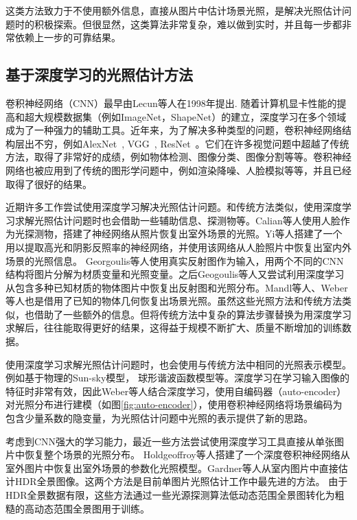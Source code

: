 这类方法致力于不使用额外信息，直接从图片中估计场景光照，是解决光照估计问题时的积极探索。但很显然，这类算法非常复杂，难以做到实时，并且每一步都非常依赖上一步的可靠结果。
\subsection{基于深度学习的光照估计方法}
卷积神经网络（CNN）最早由Lecun等人\cite{lecun1998gradient}在1998年提出. 随着计算机显卡性能的提高和超大规模数据集（例如ImageNet\cite{deng2009imagenet}，ShapeNet\cite{chang2015shapenet}）的建立，深度学习在多个领域成为了一种强力的辅助工具。近年来，为了解决多种类型的问题，卷积神经网络结构层出不穷，例如AlexNet~\cite{krizhevsky2012imagenet}, VGG~\cite{simonyan2014very}, ResNet~\cite{he2016deep}。它们在许多视觉问题中超越了传统方法，取得了非常好的成绩，例如物体检测\cite{girshick2014rich}、图像分类\cite{krizhevsky2012imagenet}、图像分割\cite{ronneberger2015u}等等。卷积神经网络也被应用到了传统的图形学问题中，例如渲染降噪\cite{chaitanya2017interactive}、人脸模拟\cite{karras2017audio}等等，并且已经取得了很好的结果。

近期许多工作尝试使用深度学习解决光照估计问题。和传统方法类似，使用深度学习求解光照估计问题时也会借助一些辅助信息、探测物等。Calian等人\cite{calian2018faces}使用人脸作为光探测物，搭建了神经网络从照片恢复出室外场景的光照。Yi等人\cite{yi2018faces}搭建了一个用以提取高光和阴影反照率的神经网络，并使用该网络从人脸照片中恢复出室内外场景的光照信息。
Georgoulis等人\cite{georgoulis2016delight}使用真实反射图作为输入，用两个不同的CNN结构将图片分解为材质变量和光照变量。之后Geogoulis等人\cite{georgoulis2016natural}又尝试利用深度学习从包含多种已知材质的物体图片中恢复出反射图和光照分布。Mandl等人\cite{mandl2017learning}、Weber等人\cite{weber2018learning}也是借用了已知的物体几何恢复出场景光照。虽然这些光照方法和传统方法类似，也借助了一些额外的信息。但将传统方法中复杂的算法步骤替换为用深度学习求解后，往往能取得更好的结果，这得益于规模不断扩大、质量不断增加的训练数据。

使用深度学习求解光照估计问题时，也会使用与传统方法中相同的光照表示模型。例如基于物理的Sun-sky模型\cite{hold2017deep}， 球形谐波函数模型\cite{mandl2017learning}等。深度学习在学习输入图像的特征时非常有效，因此Weber等人\cite{weber2018learning}结合深度学习，使用自编码器（auto-encoder）对光照分布进行建模（如图\ref{fig:auto-encoder}），使用卷积神经网络将场景编码为包含少量系数的隐变量，为光照估计问题中光照的表示提供了新的思路。

考虑到CNN强大的学习能力，最近一些方法尝试使用深度学习工具直接从单张图片中恢复整个场景的光照分布。
Holdgeoffroy等人\cite{hold2017deep}搭建了一个深度卷积神经网络从室外图片中恢复出室外场景的参数化光照模型。Gardner等人\cite{gardner2017learning}从室内图片中直接估计HDR全景图像。这两个方法是目前单图片光照估计工作中最先进的方法。
由于HDR全景数据有限，这些方法通过一些光源探测算法低动态范围全景图转化为粗糙的高动态范围全景图用于训练。


